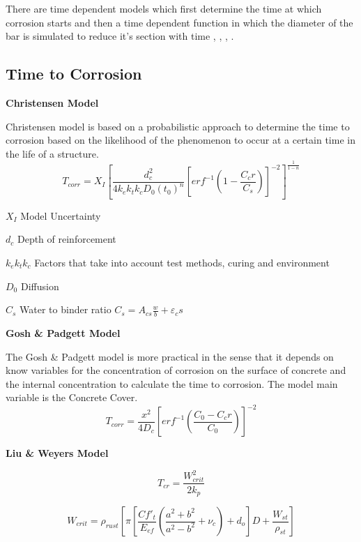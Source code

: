 There are time dependent models which first determine the time at which corrosion starts and then a time dependent function in which the diameter of the bar is simulated to reduce it’s section with time \cite{Y.Liu1998a}, \cite{Choe2008}, \cite{Thoft-Christensen}, \cite{Vu2000}.

\subsection{Time to Corrosion}

\textbf{Christensen Model}

Christensen model is based on a probabilistic approach to determine the time to corrosion based on the likelihood of the phenomenon to occur at a certain time in the life of a structure. 
\begin{equation}
  T_{corr}=X_I \left[\frac{d_c^2}{4k_e k_t k_c D_0 (t_0 )^n }\left[erf^{-1} \left(1-\frac{C_cr}{C_s} \right) \right]^{-2} \right]^{\frac{1}{1-n}}
  \label{eq:one}
\end{equation} 

$X_I$ Model Uncertainty

$d_c$ Depth of reinforcement

$k_e k_t k_c$ Factors that take into account test methods, curing and environment

$D_0$ Diffusion

$C_s$ Water to binder ratio $C_s=A_{cs}\frac{w}{b}+\varepsilon_cs$


\textbf{Gosh \& Padgett Model}

The Gosh \& Padgett model is more practical in the sense that it depends on know variables for the concentration of corrosion on the surface of concrete and the internal concentration to calculate the time to corrosion. The model main variable is the Concrete Cover.
\begin{equation}
T_{corr}=\frac{x^2}{4 D_c} \left[erf^{-1} \left(\frac{C_0-C_cr}{C_0} \right) \right]^{-2}
  \label{eq.ten}
\end{equation} 

\textbf{Liu \& Weyers Model}

\begin{equation}
  T_{cr}=\frac{W_{crit}^2}{2k_p}
  \label{eq.two}
\end{equation} 

\begin{equation}
  W_{crit}=\rho_{rust} \left[ \pi \left[ \frac{C f'_t}{E_{ef}} \left( \frac{a^2+b^2}{a^2-b^2}+\nu_c \right)+d_o \right] D+ \frac{W_{st}}{\rho_{st}} \right]
  \label{eq.three}
\end{equation} 

